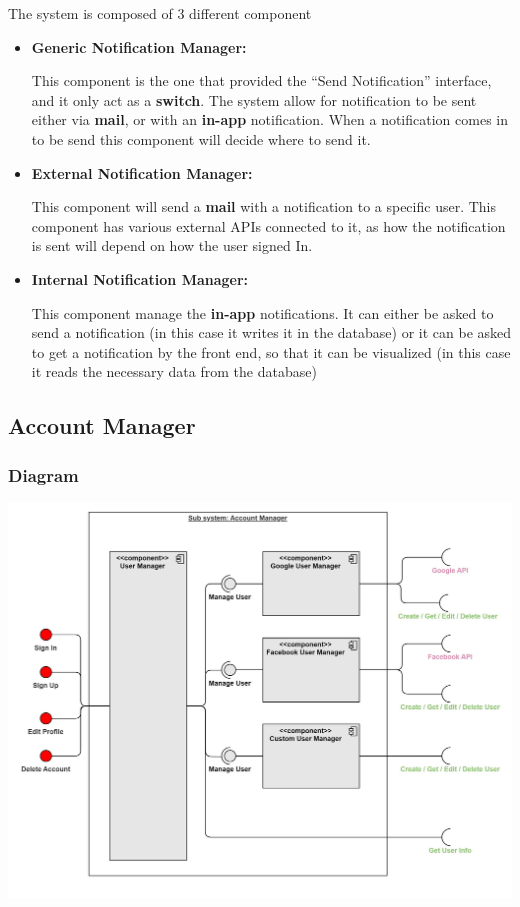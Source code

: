 \documentclass{article}
\begin{document}
The system is composed of 3 different component
\begin{itemize}
    \item \textbf{Generic Notification Manager: }

          This component is the one that provided the ``Send Notification'' interface, and it only act as
          a \textbf{switch}. The system allow for notification to be sent either via \textbf{mail}, or with an \textbf{in-app} notification.
          When a notification comes in to be send this component will decide where to send it.
    \item \textbf{External Notification Manager: }

          This component will send a \textbf{mail} with a notification to a specific user.
          This component has various external APIs connected to it, as how the notification is sent will depend on how the user signed In.
    \item \textbf{Internal Notification Manager: }

          This component manage the \textbf{in-app} notifications. It can either be asked to send a notification (in this case it writes it in the database)
          or it can be asked to get a notification by the front end, so that it can be visualized (in this case it reads the necessary data from the database)

\end{itemize}

\subsection{Account Manager}
\subsubsection{Diagram}
\includegraphics[width=\textwidth,height=\textheight,keepaspectratio]{images/component_diagram/account_manager.jpg}
\end{document}
